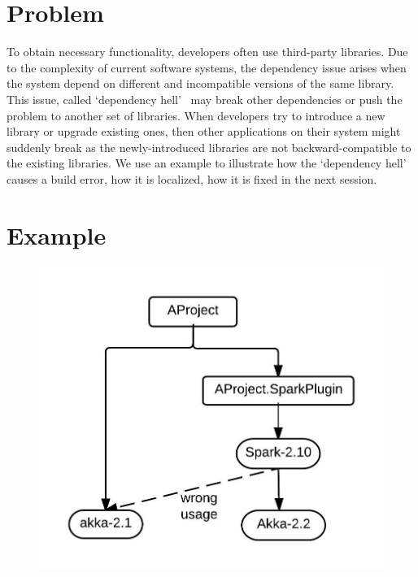 
\section{Problem}  
To obtain necessary functionality, developers often use third-party libraries. Due to the complexity of current software systems, the dependency issue arises when the system depend on different and incompatible versions of the same library. This issue, called  `dependency hell'~\cite{wiki:hell} may break other dependencies or push the problem to another set of libraries. When developers try to introduce a new library or upgrade existing ones, then other applications on their system might suddenly break as the newly-introduced libraries are not backward-compatible to the existing libraries. We use an example to illustrate how the `dependency hell' causes a build error, how it is localized, how it is fixed in the next session. 


\section{Example}


 \begin{figure}[!htb]
 \includegraphics{akka.jpeg}
 \end{figure}



